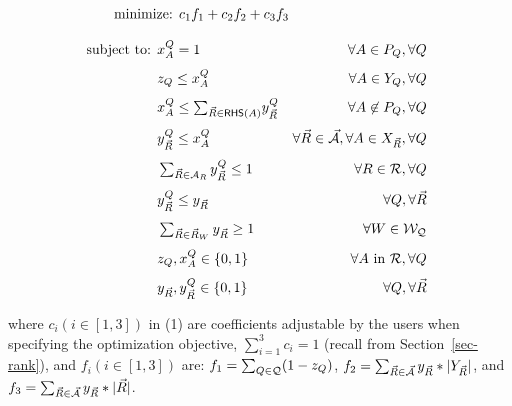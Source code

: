 \vspace{-1ex}
\begin{tcolorbox}
  \begin{alignat}{2}
\hspace{-2.6cm}\text{minimize:
} & c_{1}f_{1}+c_{2}f_{2}+c_{3}f_{3} & \hfill
  \end{alignat}
  
  \vspace{-3.3ex}
  
  \begin{alignat}{2}
   \hspace*{-0.15cm}\text{subject to: }&  x_{A}^{Q} = 1 & \forall
    A\in P_{Q}, \forall Q \\[0.8ex] 
    & z_{Q}\leq x_{A}^{Q} & \forall A \in Y_{Q},\forall Q \\[0.8ex]
    & x_{A}^{Q} \leq\textstyle \sum_{\kb{R}\in \RHS(A)}\!y_{\kb{R}}^{Q} &~\forall
    A\not\in P_{Q}, \forall Q \\[0.8ex]
    & y_{\kb{R}}^{Q} \leq x_{A}^{Q} & \forall \kb{R}\in \kb{\A}, \forall A\in X_{\kb{R}}, \forall
    Q\\[0.8ex]
    & \textstyle \sum_{\kb{R}\in \A_{R}} y_{\kb{R}}^{Q} \leq 1 & 
    \forall R\in \R, \forall Q \\[0.8ex]
    & y_{\kb{R}}^{Q} \leq y_{\kb{R}} & \forall Q, \forall \kb{R} \\[0.8ex]
    & \textstyle\sum_{\kb{R}\in \kb{R}_{W}} y_{\kb{R}} \geq 1 & \forall W\in \Wc_{\Q} \\[0.8ex]
    & z_{Q}, x_{A}^{Q} \in \{0, 1\} & \forall
    A\text{ in }\R, \forall Q\\[0.8ex]
    & y_{\kb{R}}, y_{\kb{R}}^{Q} \in \{0, 1\} & \forall Q, \forall
    \kb{R} 
  \end{alignat}
  \end{tcolorbox}

\vspace{-0.7ex}

\sstab
where $c_{i} (i\in[1, 3])$  in (1) are coefficients adjustable
by the users when specifying the
optimization objective,  $\sum_{i=1}^{3}c_{i} = 1$ (recall
from Section~\ref{sec-rank}), and $f_{i}(i\in [1, 3])$ are:
  $f_{1} = \textstyle\sum_{Q\in \mathcal Q} (1-z_{Q})$,
  $f_{2} = \textstyle\sum_{\vec{R}\in \vec{{\mathcal A}}} y_{\vec{R}}*|Y_{\vec{R}}|$,
  and
  $f_{3} = \textstyle\sum_{\vec{R}\in \vec{{\mathcal A}}} y_{\vec{R}}*|\vec{R}|$.


